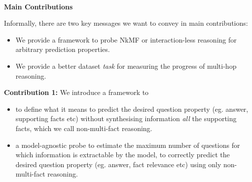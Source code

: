\-\ \\
\noindent \textbf{Main Contributions}

Informally, there are two key messages we want to convey in main contributions:

\begin{itemize}
    \item We provide a framework to probe NkMF or interaction-less reasoning for arbitrary prediction properties.
    \item We provide a better dataset \textit{task} for measuring the progress of multi-hop reasoning.
\end{itemize}




\eat{
        
}

\noindent \textbf{Contribution 1:} We introduce a framework to
\begin{itemize}
    \item to define what it means to predict the desired question property (eg. answer, supporting facts etc) without synthesising information \textit{all} the supporting facts, which we call non-multi-fact reasoning.
    \item a model-agnostic probe to estimate the maximum number of questions for which information is extractable by the model, to correctly predict the desired question property (eg. answer, fact relevance etc) using only non-multi-fact reasoning.
\end{itemize}



